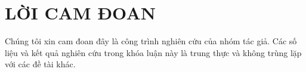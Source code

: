 \chapter*{LỜI CAM ĐOAN}
\label{reassurances}

Chúng tôi xin cam đoan đây là công trình nghiên cứu của nhóm tác giả. Các số liệu và kết quả nghiên cứu trong khóa luận này là trung thực và không trùng lặp với các đề tài khác.
